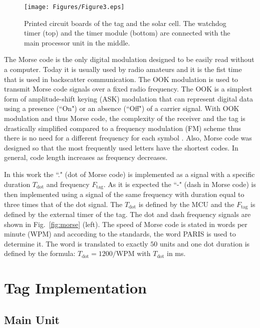 \documentclass[journal]{IEEEtran}
\begin{document}
\begin{figure}[t]
\centering
\texttt{[image: Figures/Figure3.eps]}
\caption{Printed circuit boards of the tag and the solar cell.
The  watchdog timer (top) and the timer  module (bottom)  are connected with the main processor unit in the middle.}
\label{fig:PCBs}
\end{figure}
The Morse code is the only digital modulation  designed to be easily read without a computer.
%
Today it is usually used by radio amateurs and it is the  fist time that is used in backscatter communication.
%
The OOK modulation is  used to transmit Morse code signals  over  a  fixed radio frequency.
%
The OOK  is a simplest form of amplitude-shift keying (ASK) modulation that can represent digital data using  a presence (``On") or an absence (``Off") of a carrier signal.
%
With  OOK modulation and thus Morse code,  the complexity of the receiver and the tag is drastically simplified compared to a frequency modulation (FM) scheme thus there is no need for a different frequency for each symbol \cite{proakis2008digital}.
%
Also, Morse code was designed so that the most frequently used letters have the shortest codes. In general, code length increases as frequency decreases. 

In this work the ``."  (dot of Morse code) is implemented as a  signal with a specific duration $T_\text{dot}$ and frequency $F_\text{tag}$.
%
As it is expected the ``-"  (dash in Morse code) is then implemented using a signal of the same frequency with duration equal to three times that of the dot signal.
%
The $T_\text{dot}$ is defined by the MCU and the  $F_\text{tag}$ is defined by the external timer of the tag.
%
The dot and dash frequency signals are shown in Fig.~\ref{fig:morse} (left). 
%
The speed of Morse code is stated in words per minute (WPM) and 
according to the standards, the word PARIS is used to determine it. 
%
The word is translated to exactly $50$ units and  one dot duration is defined by the formula:
$T_\text{dot} = 1200 / \text{WPM}$ with $T_\text{dot}$ in ms. 



\section{Tag Implementation}
\label{sec:tag}

\subsection{Main Unit}
\label{subsec:mainunit}
	
\end{document}
